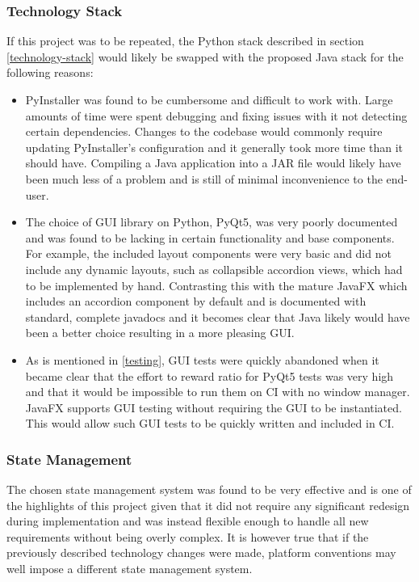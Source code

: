 \documentclass{l4proj}
\begin{document}
\subsubsection{Technology Stack}
If this project was to be repeated, the Python stack described in section \ref{technology-stack} would likely be swapped with the proposed Java stack for the following reasons:
\begin{itemize}
    \item PyInstaller was found to be cumbersome and difficult to work with. Large amounts of time were spent debugging and fixing issues with it not detecting certain dependencies. Changes to the codebase would commonly require updating PyInstaller's configuration and it generally took more time than it should have. Compiling a Java application into a JAR file would likely have been much less of a problem and is still of minimal inconvenience to the end-user.
    \item The choice of GUI library on Python, PyQt5, was very poorly documented and was found to be lacking in certain functionality and base components. For example, the included layout components were very basic and did not include any dynamic layouts, such as collapsible accordion views, which had to be implemented by hand. Contrasting this with the mature JavaFX which includes an accordion component by default and is documented with standard, complete javadocs and it becomes clear that Java likely would have been a better choice resulting in a more pleasing GUI.
    \item As is mentioned in \ref{testing}, GUI tests were quickly abandoned when it became clear that the effort to reward ratio for PyQt5 tests was very high and that it would be impossible to run them on CI with no window manager. JavaFX supports GUI testing without requiring the GUI to be instantiated. This would allow such GUI tests to be quickly written and included in CI.
\end{itemize}

\subsubsection{State Management}
The chosen state management system was found to be very effective and is one of the highlights of this project given that it did not require any significant redesign during implementation and was instead flexible enough to handle all new requirements without being overly complex. It is however true that if the previously described technology changes were made, platform conventions may well impose a different state management system.
\end{document}
